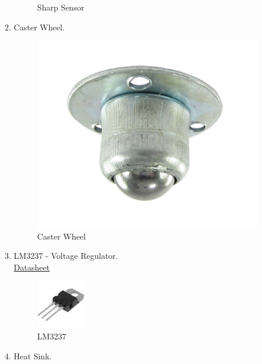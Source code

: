 \documentclass[a4paper,12pt,oneside]{book}
\begin{document}
\begin{itemize}
\begin{enumerate}
\begin{figure}[!ht]
        \caption{Sharp Sensor}
      \end{figure}
    \item Caster Wheel.
    \begin{figure}[!ht]
        \centering
        \includegraphics[scale=0.15]{caster}
        \caption{Caster Wheel}
      \end{figure}
    \item LM3237 - Voltage Regulator.\\
    \href{http://pdf.datasheetarchive.com/indexerfiles/Datasheet-044/DSA0017815.pdf}{ Datasheet}\par
   \begin{figure}[!ht]
        \centering
        \includegraphics[scale=1]{lm}
        \caption{LM3237}
      \end{figure}
    \item Heat Sink.
    \begin{figure}[!ht]
        \centering

\end{figure}
\end{enumerate}
\end{itemize}
\end{document}
